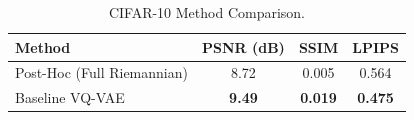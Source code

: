 \documentclass{article}
\begin{document}
\begin{table}[h!]
\caption{CIFAR-10 Method Comparison.\protect\footnotemark}
\label{tab:cifar10_results}
\begin{center}
\begin{footnotesize}
\begin{tabular}{l c c c}
\toprule
Method & PSNR (dB) & SSIM & LPIPS \\
\midrule
Post-Hoc (Full Riemannian) & 8.72 & 0.005 & 0.564 \\
Baseline VQ-VAE & \textbf{9.49} & \textbf{0.019} & \textbf{0.475} \\
\bottomrule
\end{tabular}
\end{footnotesize}
\end{center}
\vspace{-0.4cm}
\end{table}
\end{document}
